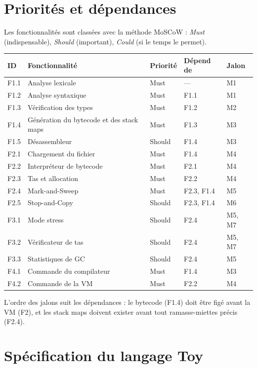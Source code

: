 \documentclass[11pt,a4paper]{article}
\newcommand{\code}[1]{\texttt{\detokenize{#1}}}
\begin{document}
\section{Priorités et dépendances}

Les fonctionnalités sont classées avec la méthode MoSCoW : \emph{Must} (indispensable), \emph{Should} (important), \emph{Could} (si le temps le permet).

\begin{longtable}{@{}p{} p{} p{} p{} p{}@{}}
\toprule
\textbf{ID} & \textbf{Fonctionnalité} & \textbf{Priorité} & \textbf{Dépend de} & \textbf{Jalon} \\
\midrule
\endhead
F1.1 & Analyse lexicale & Must & --- & M1 \\
F1.2 & Analyse syntaxique & Must & F1.1 & M1 \\
F1.3 & Vérification des types & Must & F1.2 & M2 \\
F1.4 & Génération du bytecode et des stack maps & Must & F1.3 & M3 \\
F1.5 & Désassembleur & Should & F1.4 & M3 \\
F2.1 & Chargement du fichier \code{.tbc} & Must & F1.4 & M4 \\
F2.2 & Interpréteur de bytecode & Must & F2.1 & M4 \\
F2.3 & Tas et allocation & Must & F2.2 & M4 \\
F2.4 & Mark-and-Sweep & Must & F2.3, F1.4 & M5 \\
F2.5 & Stop-and-Copy & Should & F2.3, F1.4 & M6 \\
F3.1 & Mode stress & Should & F2.4 & M5, M7 \\
F3.2 & Vérificateur de tas & Should & F2.4 & M5, M7 \\
F3.3 & Statistiques de GC & Should & F2.4 & M5 \\
F4.1 & Commande du compilateur & Must & F1.4 & M3 \\
F4.2 & Commande de la VM & Must & F2.2 & M4 \\
\bottomrule
\end{longtable}

L'ordre des jalons suit les dépendances : le bytecode (F1.4) doit être figé avant la VM (F2), et les stack maps doivent exister avant tout ramasse-miettes précis (F2.4).

\section{Spécification du langage Toy}
\end{document}
